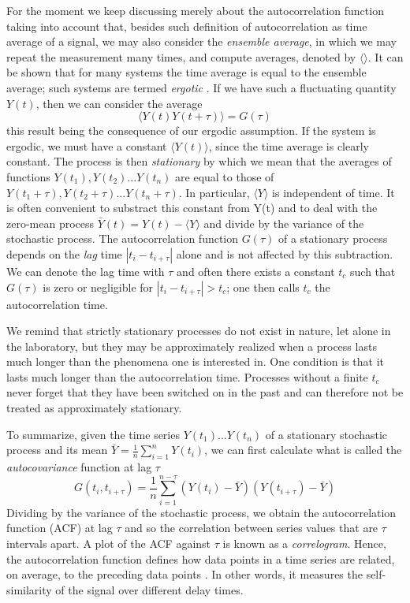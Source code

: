 \documentclass[12pt,a4paper]{report}
\begin{document}
For the moment we keep discussing merely about the autocorrelation function taking into account that, besides such definition of autocorrelation as time average of a signal, we may also consider the \emph{ensemble average}, in which we may repeat the measurement many times, and compute averages, denoted by $\langle \rangle$. It can be shown that for many systems the time average is equal to the ensemble average; such systems are termed \emph{ergotic} \cite{Hand}. If we have such a fluctuating quantity $Y(t)$, then we can consider the average
\begin{equation}
    \langle Y(t)Y(t+\tau) \rangle = G(\tau)
\end{equation}
this result being the consequence of our ergodic assumption. If the system is ergodic, we must have a constant $\langle Y(t) \rangle$, since the time average is clearly constant. The process is then \emph{stationary} by which we mean that the averages of functions $Y(t_{1}),Y(t_{2})...Y(t_{n})$ are equal to those of $Y(t_{1}+\tau),Y(t_{2}+\tau)...Y(t_{n}+\tau)$. In particular, $\langle Y \rangle$ is independent of time.  It is often convenient to substract this constant from Y(t) and to deal with the zero-mean process $\bar{Y}(t) = Y(t) - \langle Y \rangle$ and divide by the variance of the stochastic process. The autocorrelation function $G(\tau)$ of a stationary process depends on the \emph{lag} time $|t_{i}-t_{i+\tau}|$ alone and is not affected by this subtraction. We can denote the lag time with $\tau$ and often there exists a constant $t_{c}$ such that $G(\tau)$ is zero or negligible for $|t_{i}-t_{i+\tau}|> t_{c}$; one then calls $t_{c}$ the autocorrelation time.

We remind that strictly stationary processes do not exist in nature, let alone in the laboratory, but they may be approximately realized when a process lasts much longer than the phenomena one is interested in. One condition is that it lasts much longer than the autocorrelation time. Processes without a finite $t_{c}$ never forget that they have been switched on in the past and can therefore not be treated as approximately stationary.

To summarize, given the time series $Y(t_{1})...Y(t_{n})$ of a stationary stochastic process and its mean $\bar{Y}= \frac{1}{n}\sum_{i=1}^{n} Y(t_{i}) $, we can first calculate what is called the \emph{autocovariance} function at lag $\tau$
    \begin{equation}
        G(t_{i},t_{i+\tau}) = \frac{1}{n}\sum_{i=1}^{n-\tau}(Y(t_{i})-\bar{Y})(Y(t_{i+\tau})-\bar{Y})
    \end{equation}
Dividing by the variance of the stochastic process, we obtain the autocorrelation function (ACF) at lag $\tau$ and so the correlation between  series values that are $\tau$ intervals apart. A plot of the ACF against $\tau$ is known as a \emph{correlogram}.
\newline
Hence, the autocorrelation function defines how data points in a time series are related, on average, to the preceding data points \cite{ACF}. In other words, it measures the self-similarity of the signal over different delay times. 
\end{document}
